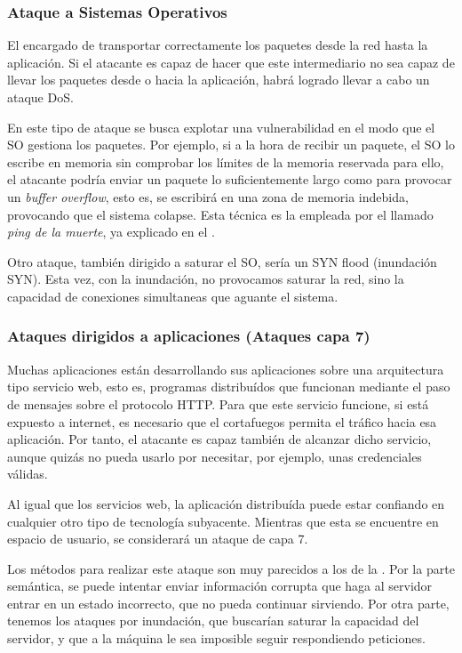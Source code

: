 \subsubsection{Ataque a Sistemas Operativos}

El encargado de transportar correctamente los paquetes desde la red hasta la aplicación. Si el atacante es capaz de 
hacer que este intermediario no sea capaz de llevar los paquetes desde o hacia la aplicación, habrá logrado llevar a 
cabo un ataque \gls{DoS}.

En este tipo de ataque se busca explotar una vulnerabilidad en el modo que el \gls{SO} gestiona los paquetes. Por 
ejemplo, si a la hora de recibir un paquete, el \gls{SO} lo escribe en memoria sin comprobar los límites de la memoria 
reservada para ello, el atacante podría enviar un paquete lo suficientemente largo como para provocar un \emph{buffer 
overflow}, esto es, se escribirá en una zona de memoria indebida, provocando que el sistema 
colapse. Esta técnica es la empleada por el llamado \emph{ping de la muerte}, ya explicado en 
el .

Otro ataque, también dirigido a saturar el \gls{SO}, sería un \gls{SYN} flood (inundación \gls{SYN}). Esta vez, con la inundación, 
no provocamos saturar la red, sino la capacidad de conexiones simultaneas que aguante el sistema.

\subsubsection{Ataques dirigidos a aplicaciones (Ataques capa 7)}

Muchas aplicaciones están desarrollando sus aplicaciones sobre una arquitectura tipo servicio web, esto es, programas 
distribuídos que funcionan mediante el paso de mensajes sobre el protocolo HTTP. Para que este servicio funcione, si 
está expuesto a internet, es necesario que el cortafuegos permita el tráfico hacia esa aplicación. Por tanto, el 
atacante es capaz también de alcanzar dicho servicio, aunque quizás no pueda usarlo por necesitar, por ejemplo, unas 
credenciales válidas.

Al igual que los servicios web, la aplicación distribuída puede estar confiando en cualquier otro tipo de tecnología 
subyacente. Mientras que esta se encuentre en espacio de usuario, se considerará un ataque de capa 7.

Los métodos para realizar este ataque son muy parecidos a los de la . Por la parte semántica, se 
puede intentar enviar información corrupta que haga al servidor entrar en un estado incorrecto, que no pueda continuar 
sirviendo. Por otra parte, tenemos los ataques por inundación, que buscarían saturar la capacidad del servidor, y que 
a la máquina le sea imposible seguir respondiendo peticiones.


